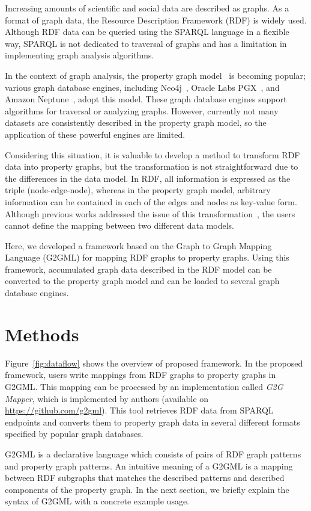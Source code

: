 \documentclass[runningheads]{llncs}
\begin{document}
Increasing amounts of scientific and social data are described as graphs. As a format of graph data, the Resource Description Framework (RDF) is widely used. Although RDF data can be queried using the SPARQL language in a flexible way, SPARQL is not dedicated to traversal of graphs and has a limitation in implementing graph analysis algorithms.

In the context of graph analysis, the property graph model~\cite{angles} is becoming popular; various graph database engines, including Neo4j~\cite{neo4j}, Oracle Labs PGX~\cite{pgx}, and Amazon Neptune~\cite{neptune}, adopt this model. These graph database engines support algorithms for traversal or analyzing graphs. However, currently not many datasets are consistently described in the property graph model, so the application of these powerful engines are limited.

Considering this situation, it is valuable to develop a method to transform RDF data into property graphs, but the transformation is not straightforward due to the differences in the data model. 
In RDF, all information is expressed as the triple (node-edge-node), whereas in the property graph model, arbitrary information can be contained in each of the edges and nodes as key-value form. 
Although previous works addressed the issue of this transformation~\cite{hartig},
the users cannot define the mapping between two different data models.

Here, we developed a framework based on the Graph to Graph Mapping Language (G2GML) for mapping RDF graphs to property graphs. Using this framework, accumulated graph data described in the RDF model can be converted to the property graph model and can be loaded to several graph database engines. 

\section{Methods}

Figure~\ref{fig:dataflow} shows the overview of proposed framework.
In the proposed framework, users write mappings from RDF graphs to property graphs in G2GML.
This mapping can be processed by an implementation called \textit{G2G Mapper}, which is implemented by authors (available on \url{https://github.com/g2gml}). This tool retrieves RDF data from SPARQL endpoints and converts them to property graph data in several different formats specified by popular graph databases.

G2GML is a declarative language which consists of pairs of RDF graph patterns and property graph patterns. 
An intuitive meaning of a G2GML is a mapping between RDF subgraphs that matches the described patterns and described components of the property graph. In the next section, we briefly explain the syntax of G2GML with a concrete example usage.
\end{document}
